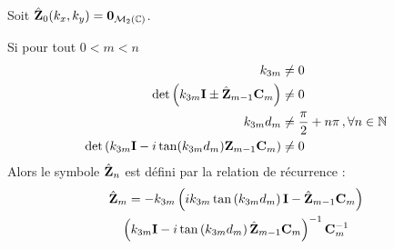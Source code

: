         \begin{thm}
            Soit \(\hat {\mathbf{Z}}_0(k_x,k_y) = \mathbf{0}_{\mathcal{M}_2(\mathbb C)}\).

            Si pour tout \(0<m < n\)
            \begin{align}
                k_{3m} &\not = 0 \\
                \det\left(k_{3m}\mathbf{I} \pm \hat {\mathbf{Z}}_{m-1}\mathbf{C}_m \right) &\not = 0 \\
                k_{3m}d_m &\not = \dfrac{\pi}{2}+n\pi\,, \forall n \in \mathbb N \\
                \det\left(k_{3m}\mathbf{I} - i\tan(k_{3m}d_m)\mathbf{Z}_{m-1}\mathbf{C}_m\right) &\not = 0
            \end{align}
            Alors le symbole \(\hat {\mathbf{Z}}_n\) est défini par la relation de récurrence :
            \begin{multline}
                \hat {\mathbf{Z}}_m = -k_{3m}
                \left(ik_{3m}\tan\left(k_{3m}d_m\right)\mathbf{I} - \hat {\mathbf{Z}}_{m-1}\mathbf{C}_m\right) \\
                \left(k_{3m}\mathbf{I} - i\tan\left(k_{3m}d_m\right)\hat {\mathbf{Z}}_{m-1}\mathbf{C}_m\right)^{-1}
                \mathbf{C}_m^{-1}
            \end{multline}
        \end{thm}

